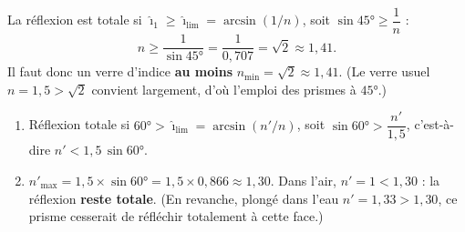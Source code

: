 \documentclass[11pt,a4paper]{article}
\begin{document}
\begin{corrige}
La réflexion est totale si $\hat{\imath}_1\ge\hat{\imath}_{\text{lim}}=\arcsin(1/n)$, soit
$\sin\ang{45}\ge\dfrac{1}{n}$ :
\[ n\ge\frac{1}{\sin\ang{45}}=\frac{1}{0{,}707}=\sqrt{2}\approx1{,}41. \]
Il faut donc un verre d'indice \textbf{au moins} $n_{\min}=\sqrt{2}\approx1{,}41$. (Le verre usuel
$n=1{,}5>\sqrt2$ convient largement, d'où l'emploi des prismes à $\ang{45}$.)
\end{corrige}

\begin{corrige}
\begin{enumerate}[label=\alph*)]
  \item Réflexion totale si $\ang{60}>\hat{\imath}_{\text{lim}}=\arcsin(n'/n)$, soit
        $\sin\ang{60}>\dfrac{n'}{1{,}5}$, c'est-à-dire $\boxed{n'<1{,}5\,\sin\ang{60}}$.
  \item $n'_{\max}=1{,}5\times\sin\ang{60}=1{,}5\times0{,}866\approx1{,}30$. Dans l'air, $n'=1<1{,}30$ :
        la réflexion \textbf{reste totale}. (En revanche, plongé dans l'eau $n'=1{,}33>1{,}30$, ce
        prisme cesserait de réfléchir totalement à cette face.)
\end{enumerate}
\end{corrige}
\end{document}
